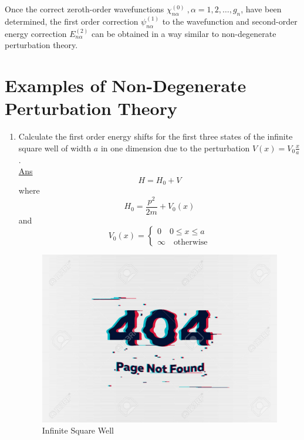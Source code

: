 		Once the correct zeroth-order wavefunctions $\chi_{n\alpha}^{(0)}\ , \alpha=1,2, \ldots, g_n$, have been determined, the first order correction $\psi_{n \alpha}^{(1)}$ to the wavefunction and second-order energy correction $E_{n\alpha}^{(2)}$ can be obtained in a way similar to non-degenerate perturbation theory.
		
		
		
		\section{Examples of Non-Degenerate Perturbation Theory}
		\begin{enumerate}[label=Problem.\arabic*,start=1]
			\item 
			Calculate the first order energy shifts for the first three states of the infinite square well of width $a$ in one dimension due to the perturbation $V(x) = V_0 \frac{x}{a}$.\\
			
			\underline{Ans}\\
			\begin{equation*}
				H = H_0 + V
			\end{equation*}
			where
			\begin{equation*}
				H_0 = \frac{p^2}{2m} + V_0(x)
			\end{equation*}
			and
			\begin{equation*}
				V_0(x) = \begin{cases}
				0 \quad 0 \leq x \leq a \\
				\infty \quad \text{otherwise}
				\end{cases}
			\end{equation*}
			
			
			\begin{figure}
				\centering
				\includegraphics[width=0.5\linewidth]{Pictures/not-found.jpg}
				\caption{Infinite Square Well}
			\end{figure}
			

\end{enumerate}
